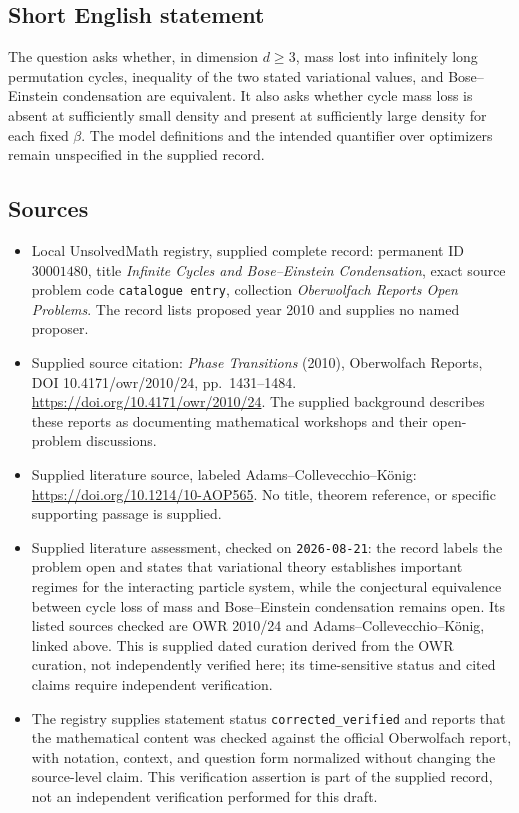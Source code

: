 \documentclass[11pt]{article}
\begin{document}
\subsection{Short English statement}
The question asks whether, in dimension \(d\geq3\), mass lost into infinitely long permutation cycles, inequality of the two stated variational values, and Bose--Einstein condensation are equivalent. It also asks whether cycle mass loss is absent at sufficiently small density and present at sufficiently large density for each fixed \(\beta\). The model definitions and the intended quantifier over optimizers remain unspecified in the supplied record.
\subsection{Sources}
\begin{itemize}
\item Local UnsolvedMath registry, supplied complete record: permanent ID \(30001480\), title \emph{Infinite Cycles and Bose--Einstein Condensation}, exact source problem code \texttt{catalogue entry}, collection \emph{Oberwolfach Reports Open Problems}. The record lists proposed year 2010 and supplies no named proposer.
\item Supplied source citation: \emph{Phase Transitions} (2010), Oberwolfach Reports, DOI 10.4171/owr/2010/24, pp.\ 1431--1484. \url{https://doi.org/10.4171/owr/2010/24}. The supplied background describes these reports as documenting mathematical workshops and their open-problem discussions.
\item Supplied literature source, labeled Adams--Collevecchio--K\"onig: \url{https://doi.org/10.1214/10-AOP565}. No title, theorem reference, or specific supporting passage is supplied.
\item Supplied literature assessment, checked on \texttt{2026-08-21}: the record labels the problem open and states that variational theory establishes important regimes for the interacting particle system, while the conjectural equivalence between cycle loss of mass and Bose--Einstein condensation remains open. Its listed sources checked are OWR 2010/24 and Adams--Collevecchio--K\"onig, linked above. This is supplied dated curation derived from the OWR curation, not independently verified here; its time-sensitive status and cited claims require independent verification.
\item The registry supplies statement status \texttt{corrected\_verified} and reports that the mathematical content was checked against the official Oberwolfach report, with notation, context, and question form normalized without changing the source-level claim. This verification assertion is part of the supplied record, not an independent verification performed for this draft.
\end{itemize}
\end{document}

